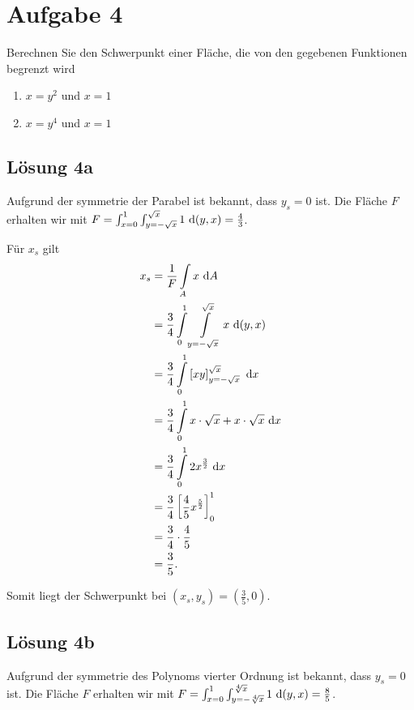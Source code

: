 \documentclass[main.tex]{subfiles}
\begin{document}
\section{Aufgabe 4}
Berechnen Sie den Schwerpunkt einer Fläche, die von den gegebenen Funktionen begrenzt wird
\begin{enumerate}
    \item $x = y^2$ \quad und \quad $x = 1$
    \item $x = y^4$ \quad und \quad $x = 1$
\end{enumerate}

\subsection{Lösung 4a}
Aufgrund der symmetrie der Parabel ist bekannt, dass $y_s=0$ ist.
Die Fläche $F$ erhalten wir mit $F = \int_{x=0}^{1} \int_{y=-\sqrt{x}}^{\sqrt{x}} 1 ~\mathrm{d}(y,x) = \frac{4}{3}$.

Für $x_s$ gilt
\begin{align*}
    x_s &= \frac{1}{F} \int \limits_A x ~\mathrm{d}A \\
        &= \frac{3}{4} \int \limits_{0}^{1} \int \limits_{y=-\sqrt{x}}^{\sqrt{x}} x ~\mathrm{d}(y,x) \\
        &= \frac{3}{4} \int \limits_{0}^{1} \left[ xy \right]_{y=-\sqrt{x}}^{\sqrt{x}} ~\mathrm{d}x \\
        &= \frac{3}{4} \int \limits_{0}^{1} x\cdot \sqrt{x} + x\cdot \sqrt{x} ~\mathrm{d}x \\
        &= \frac{3}{4} \int \limits_{0}^{1} 2 {x}^{\frac{3}{2}} ~\mathrm{d}x \\
        &= \frac{3}{4} \left[ \frac{4}{5} {x}^{\frac{5}{2}} \right]_{0}^{1} \\
        &= \frac{3}{4} \cdot \frac{4}{5}  \\
        &= \frac{3}{5}. \\
\end{align*}

Somit liegt der Schwerpunkt bei $(x_s, y_s) = \left(\frac{3}{5}, 0\right)$.

\subsection{Lösung 4b}

Aufgrund der symmetrie des Polynoms vierter Ordnung ist bekannt, dass $y_s=0$ ist.
Die Fläche $F$ erhalten wir mit $F = \int_{x=0}^{1} \int_{y=-\sqrt[4]{x}}^{\sqrt[4]{x}} 1 ~\mathrm{d}(y,x) = \frac{8}{5}$.
\end{document}
